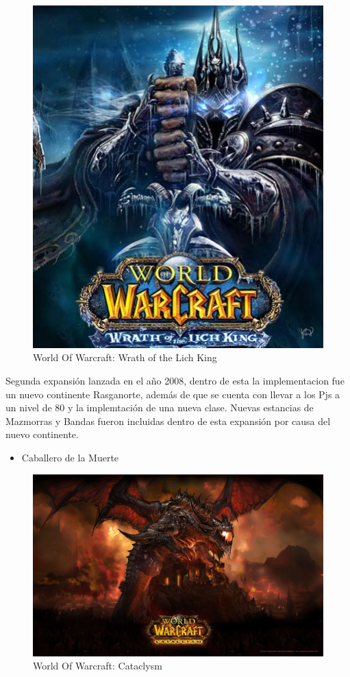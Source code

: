 \newpage
\begin{figure}[htbp]
\begin{center}
\includegraphics[width=.60\textwidth]{./imagenes/WOW.jpg}
\caption{World Of Warcraft: Wrath of the Lich King}
\label{World Of Warcraft: Wrath of the Lich King}
\end{center}
\end{figure}
Segunda expansión lanzada en el año 2008, dentro de esta la implementacion fue un nuevo continente Rasganorte, además de que se cuenta con llevar a los Pjs a un nivel de 80 y la implemtación de una nueva clase. Nuevas estancias de Mazmorras y Bandas fueron incluidas dentro de esta expansión por causa del nuevo continente.

\begin{itemize}
\item Caballero de la Muerte
\end{itemize}

\newpage
\begin{figure}[htbp]
\begin{center}
\includegraphics[width=.60\textwidth]{./imagenes/wowcataclysm.jpg}
\caption{World Of Warcraft: Cataclysm}
\label{World Of Warcraft: Cataclysm}
\end{center}
\end{figure}

